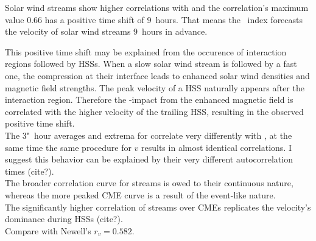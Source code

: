 Solar wind streams show higher correlations with \Kp{} and the correlation's maximum value 0.66 has a positive time shift of 9~hours. That means the \Kp~index forecasts the velocity of solar wind streams 9~hours in advance.

This positive time shift may be explained from the occurence of interaction regions followed by HSSs. When a slow solar wind stream is followed by a fast one, the compression at their interface leads to enhanced solar wind densities and magnetic field strengths. The peak velocity of a HSS naturally appears after the interaction region. Therefore the \Kp-impact from the enhanced magnetic field is correlated with the higher velocity of the trailing HSS, resulting in the observed positive time shift.\\

The 3"~hour averages and extrema for \vBz{} correlate very differently with \Kp{}, at the same time the same procedure for $v$ results in almost identical correlations. I suggest this behavior can be explained by their very different autocorrelation times (cite?).\\

The broader correlation curve for streams is owed to their continuous nature, whereas the more peaked CME curve is a result of the event-like nature.\\

The significantly higher correlation of streams over CMEs replicates the velocity's dominance during HSSs (cite?).\\

Compare with Newell's $r_v = 0.582$.\\


